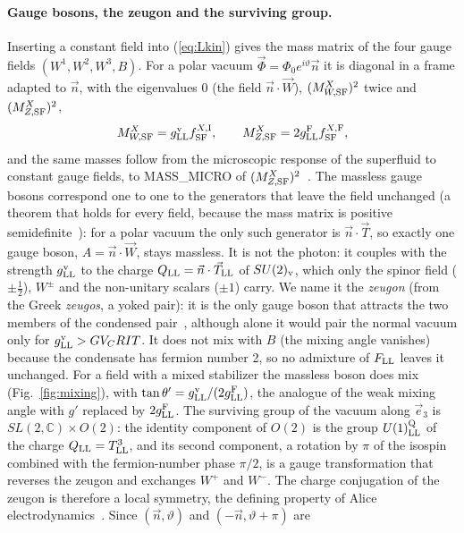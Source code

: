\documentclass[aps,prd,twocolumn,superscriptaddress,nofootinbib,floatfix,longbibliography]{revtex4-2}
\newcommand{\LL}{{\rm LL}}
\newcommand{\SF}{{\rm SF}}
\begin{document}
\paragraph*{Gauge bosons, the zeugon and the surviving group.}
Inserting a constant field into (\ref{eq:Lkin}) gives the mass matrix of the four gauge fields
$(W^1,W^2,W^3,B)$. For a polar vacuum $\vec\Phi=\Phi_0e^{i\vartheta}\vec n$ it is diagonal in a frame adapted to $\vec n$, with the
eigenvalues $0$ (the field $\vec n\cdot\vec W$), $(M^X_{W,\SF})^2$ twice and $(M^X_{Z,\SF})^2$,
\begin{equation}
M^X_{W,\SF}=g^{\rm v}_\LL f^{X,{\rm I}}_\SF ,\qquad M^X_{Z,\SF}=2g^{\rm F}_\LL f^{X,{\rm F}}_\SF ,
\label{eq:masses}
\end{equation}
and the same masses follow from the microscopic response of the superfluid to constant gauge fields, to
{{MASS_MICRO}} of $(M^X_{Z,\SF})^2$~\cite{SM}. The massless gauge bosons correspond one to one to the generators that leave the field
unchanged (a theorem that holds for every field, because the mass matrix is positive semidefinite~\cite{SM}): for a polar
vacuum the only such generator is $\vec n\cdot\vec T$, so exactly one gauge boson, $A=\vec n\cdot\vec W$, stays massless. It is not
the photon: it couples with the strength $g^{\rm v}_\LL$ to the charge $Q_\LL=\vec n\cdot\vec T_\LL$ of $SU(2)_{\rm v}$, which only
the spinor field ($\pm\frac12$), $W^\pm$ and the non-unitary scalars ($\pm1$) carry. We name it the \emph{zeugon} (from the
Greek \emph{zeugos}, a yoked pair): it is the only gauge boson that attracts the two members of the condensed
pair~\cite{SM}, although alone it would pair the normal vacuum only for $g^{\rm v}_\LL>{{GV_CRIT}}$. It does not mix with $B$
(the mixing angle vanishes) because the condensate has fermion number 2, so no admixture of $F_\LL$ leaves it unchanged. For
a field with a mixed stabilizer the massless boson does mix (Fig.~\ref{fig:mixing}), with $\tan\theta'=g^{\rm v}_\LL/(2g^{\rm F}_\LL)$,
the analogue of the weak mixing angle with $g'$ replaced by $2g^{\rm F}_\LL$. The surviving group of the vacuum along $\vec e_3$ is
$SL(2,\mathbb C)\times O(2)$: the identity component of $O(2)$ is the group $U(1)^{\rm Q}_\LL$ of the charge
$Q_\LL=T^3_\LL$, and its second component, a rotation by $\pi$ of the isospin combined with the fermion-number phase $\pi/2$,
is a gauge transformation that reverses the zeugon and exchanges $W^+$ and $W^-$. The charge conjugation of the zeugon is
therefore a local symmetry, the defining property of Alice
electrodynamics~\cite{Kiskis1978,Schwarz1982,BucherLoPreskill1992}. Since $(\vec n,\vartheta)$ and $(-\vec n,\vartheta+\pi)$ are
\end{document}
